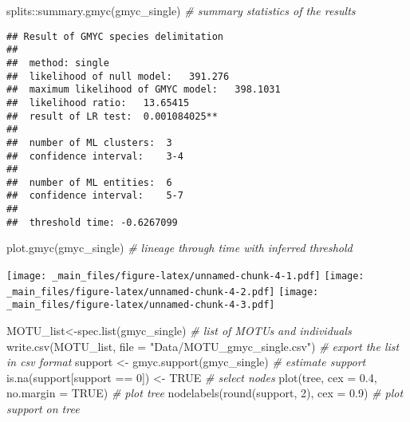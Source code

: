 \documentclass[
]{book}
\newenvironment{Shaded}{\begin{snugshade}}{\end{snugshade}}
\newcommand{\AttributeTok}[1]{\textcolor[rgb]{0.77,0.63,0.00}{#1}}
\newcommand{\CommentTok}[1]{\textcolor[rgb]{0.56,0.35,0.01}{\textit{#1}}}
\newcommand{\ConstantTok}[1]{\textcolor[rgb]{0.00,0.00,0.00}{#1}}
\newcommand{\DecValTok}[1]{\textcolor[rgb]{0.00,0.00,0.81}{#1}}
\newcommand{\FloatTok}[1]{\textcolor[rgb]{0.00,0.00,0.81}{#1}}
\newcommand{\FunctionTok}[1]{\textcolor[rgb]{0.00,0.00,0.00}{#1}}
\newcommand{\NormalTok}[1]{#1}
\newcommand{\OtherTok}[1]{\textcolor[rgb]{0.56,0.35,0.01}{#1}}
\newcommand{\SpecialCharTok}[1]{\textcolor[rgb]{0.00,0.00,0.00}{#1}}
\newcommand{\StringTok}[1]{\textcolor[rgb]{0.31,0.60,0.02}{#1}}
\begin{document}
\begin{Shaded}
\begin{Highlighting}[]
\NormalTok{splits}\SpecialCharTok{::}\FunctionTok{summary.gmyc}\NormalTok{(gmyc\_single) }\CommentTok{\# summary statistics of the results}
\end{Highlighting}
\end{Shaded}

\begin{verbatim}
## Result of GMYC species delimitation
## 
##  method: single
##  likelihood of null model:   391.276
##  maximum likelihood of GMYC model:   398.1031
##  likelihood ratio:   13.65415
##  result of LR test:  0.001084025**
## 
##  number of ML clusters:  3
##  confidence interval:    3-4
## 
##  number of ML entities:  6
##  confidence interval:    5-7
## 
##  threshold time: -0.6267099
\end{verbatim}

\begin{Shaded}
\begin{Highlighting}[]
\FunctionTok{plot.gmyc}\NormalTok{(gmyc\_single) }\CommentTok{\# lineage through time with inferred threshold}
\end{Highlighting}
\end{Shaded}

\texttt{[image: \_main\_files/figure-latex/unnamed-chunk-4-1.pdf]} \texttt{[image: \_main\_files/figure-latex/unnamed-chunk-4-2.pdf]} \texttt{[image: \_main\_files/figure-latex/unnamed-chunk-4-3.pdf]}

\begin{Shaded}
\begin{Highlighting}[]
\NormalTok{MOTU\_list}\OtherTok{\textless{}{-}}\FunctionTok{spec.list}\NormalTok{(gmyc\_single) }\CommentTok{\# list of MOTUs and individuals}
\FunctionTok{write.csv}\NormalTok{(MOTU\_list, }\AttributeTok{file =} \StringTok{"Data/MOTU\_gmyc\_single.csv"}\NormalTok{) }\CommentTok{\# export the list in csv format}
\NormalTok{support }\OtherTok{\textless{}{-}} \FunctionTok{gmyc.support}\NormalTok{(gmyc\_single) }\CommentTok{\# estimate support}
\FunctionTok{is.na}\NormalTok{(support[support }\SpecialCharTok{==} \DecValTok{0}\NormalTok{]) }\OtherTok{\textless{}{-}} \ConstantTok{TRUE} \CommentTok{\# select nodes}
\FunctionTok{plot}\NormalTok{(tree, }\AttributeTok{cex =} \FloatTok{0.4}\NormalTok{, }\AttributeTok{no.margin =} \ConstantTok{TRUE}\NormalTok{) }\CommentTok{\# plot tree}
\FunctionTok{nodelabels}\NormalTok{(}\FunctionTok{round}\NormalTok{(support, }\DecValTok{2}\NormalTok{), }\AttributeTok{cex =} \FloatTok{0.9}\NormalTok{) }\CommentTok{\# plot support on tree}
\end{Highlighting}
\end{Shaded}
\end{document}
